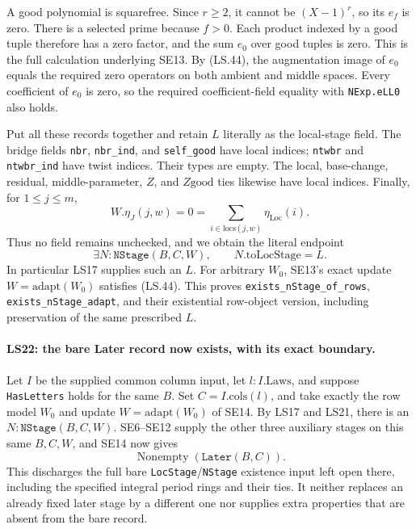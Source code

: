 A good polynomial is squarefree. Since $r\ge2$, it cannot be
$(X-1)^r$, so its $e_f$ is zero. There is a selected prime
because $f>0$. Each product indexed by a good tuple therefore
has a zero factor, and the sum $e_0$ over good tuples is zero.
This is the full calculation underlying SE13. By (LS.44), the
augmentation image of $e_0$ equals the required zero operators
on both ambient and middle spaces. Every coefficient of $e_0$
is zero, so the required coefficient-field equality with
\texttt{NExp.eLL0} also holds.

Put all these records together and retain $L$ literally as the
local-stage field. The bridge fields \texttt{nbr},
\texttt{nbr\_ind}, and \texttt{self\_good} have local indices;
\texttt{ntwbr} and \texttt{ntwbr\_ind} have twist indices.
Their types are empty. The local, base-change, residual,
middle-parameter, $Z$, and $Z\mathrm{good}$ ties likewise
have local indices. Finally, for $1\le j\le m$,
\[
 W.\eta_J(j,w)=0
       =\sum_{i\in\mathrm{locs}(j,w)}\eta_{\mathrm{Loc}}(i).
                                                               \tag{LS.47}
\]
Thus no field remains unchecked, and we obtain the literal endpoint
\[
 \exists N:\texttt{NStage}(B,C,W),\qquad N.\mathrm{toLocStage}=L.
                                                               \tag{LS.48}
\]
In particular LS17 supplies such an $L$. For arbitrary $W_0$,
SE13's exact update $W=\mathrm{adapt}(W_0)$ satisfies (LS.44).
This proves \texttt{exists\_nStage\_of\_rows},
\texttt{exists\_nStage\_adapt}, and their existential row-object
version, including preservation of the same prescribed $L$.

\paragraph{LS22: the bare Later record now exists, with its exact boundary.}
Let $I$ be the supplied common column input, let $l:I.\mathrm{Laws}$,
and suppose \texttt{HasLetters} holds for the same $B$.
Set $C=I.\mathrm{cols}(l)$, and take exactly the row model
$W_0$ and update $W=\mathrm{adapt}(W_0)$ of SE14.
By LS17 and LS21, there is an
$N:\texttt{NStage}(B,C,W)$. SE6--SE12 supply the other
three auxiliary stages on this same $B,C,W$, and SE14 now gives
\[
                         \operatorname{Nonempty}
                              (\texttt{Later}(B,C)).       \tag{LS.49}
\]
This discharges the full bare \texttt{LocStage}/\texttt{NStage}
existence input left open there, including the specified integral
period rings and their ties. It neither replaces an already fixed
later stage by a different one nor supplies extra properties that
are absent from the bare record.

